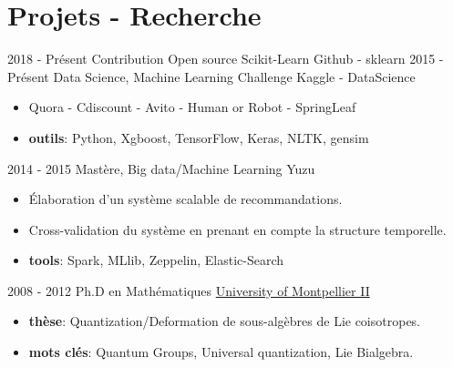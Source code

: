 \documentclass[letterpaper]{twentysecondcvfr} %
\begin{document}
\section{Projets - Recherche}{\faClipboard}
\begin{twenty}
	\twentyitem
			{2018 - }
			{Pr\'esent}
			{Contribution Open source Scikit-Learn}
			{Github - sklearn}
			{}
			{}
	\twentyitem
			{2015 - }
			{Pr\'esent}
			{Data Science, Machine Learning Challenge}
			{Kaggle - DataScience}
			{}
			{\begin{itemize}
			 \item Quora - Cdiscount - Avito - Human or Robot - SpringLeaf
			 \item \textbf{outils}: Python, Xgboost, TensorFlow, Keras, NLTK, gensim
			\end{itemize}}
	\twentyitem
    	{2014 - 2015}
		{}
        {Mast\`ere, Big data/Machine Learning}
        {Yuzu}
        {}
        {\begin{itemize}
        \item \'Elaboration d'un syst\`eme scalable de recommandations.
        \item Cross-validation du syst\`eme en prenant en compte la structure temporelle.
        \item \textbf{tools}: Spark, MLlib, Zeppelin, Elastic-Search
		\end{itemize}}
	\twentyitem
			{2008 - 2012}
			{}
			{Ph.D en Math\'ematiques}
			{\href{http://www.umontpellier.fr/}{University of Montpellier II}}
			{}
			{\begin{itemize}
			\item \textbf{th\`ese}: Quantization/Deformation de sous-alg\`ebres de Lie coisotropes.
			\item \textbf{mots cl\'es}: Quantum Groups, Universal quantization, Lie Bialgebra.
			\end{itemize}}
\end{twenty}
\end{document}
